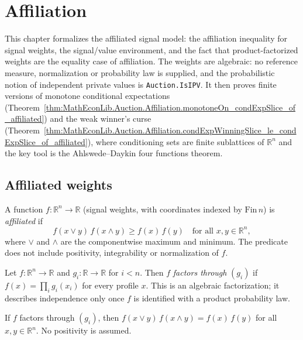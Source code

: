 \chapter{Affiliation}

This chapter formalizes the affiliated signal model: the affiliation inequality for signal weights, the signal/value environment, and the fact that product-factorized weights are the equality case of affiliation. The weights are algebraic: no reference measure, normalization or probability law is supplied, and the probabilistic notion of independent private values is \texttt{Auction.IsIPV}. It then proves finite versions of monotone conditional expectations (Theorem~\ref{thm:MathEconLib.Auction.Affiliation.monotoneOn_condExpSlice_of_affiliated}) and the weak winner's curse (Theorem~\ref{thm:MathEconLib.Auction.Affiliation.condExpWinningSlice_le_condExpSlice_of_affiliated}), where conditioning sets are finite sublattices of $\mathbb{R}^n$ and the key tool is the Ahlswede--Daykin four functions theorem.

\section{Affiliated weights}

\begin{definition}\label{def:MathEconLib.Auction.Affiliation.Affiliated}
\leanok
A function $f : \mathbb{R}^n \to \mathbb{R}$ (signal weights, with coordinates indexed by $\mathrm{Fin}\,n$) is \emph{affiliated} if
\[
  f(x \vee y)\, f(x \wedge y) \ge f(x)\, f(y) \quad \text{for all } x, y \in \mathbb{R}^n,
\]
where $\vee$ and $\wedge$ are the componentwise maximum and minimum. The predicate does not include positivity, integrability or normalization of $f$.
\end{definition}

\begin{definition}\label{def:MathEconLib.Auction.Affiliation.Factors}
\leanok
Let $f : \mathbb{R}^n \to \mathbb{R}$ and $g_i : \mathbb{R} \to \mathbb{R}$ for $i < n$. Then $f$ \emph{factors through} $(g_i)$ if $f(x) = \prod_{i} g_i(x_i)$ for every profile $x$. This is an algebraic factorization; it describes independence only once $f$ is identified with a product probability law.
\end{definition}

\begin{theorem}\label{thm:MathEconLib.Auction.Affiliation.factors_affiliation_eq}
\leanok
{}
If $f$ factors through $(g_i)$, then $f(x \vee y)\, f(x \wedge y) = f(x)\, f(y)$ for all $x, y \in \mathbb{R}^n$. No positivity is assumed.
\end{theorem}

